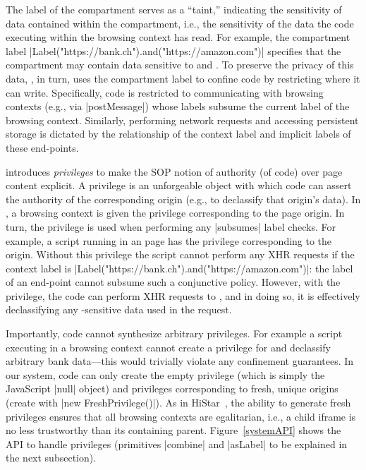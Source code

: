 The label of the compartment serves as a ``taint,'' indicating the
sensitivity of data contained within the compartment, i.e., the
sensitivity of the data the code executing within the browsing context
has read.
%
For example, the compartment label
\js|Label("https://bank.ch").and("https://amazon.com")| specifies that
the compartment may contain data sensitive to  and
.
%
To preserve the privacy of this data, \sys{}, in turn, uses the
compartment label to confine code by restricting where it can write.
%
Specifically, code is restricted to communicating with browsing
contexts (e.g., via \js|postMessage|) whose labels subsume the current
label of the browsing context.
%
Similarly, performing network requests and accessing persistent storage is
dictated by the relationship of the context label and implicit labels of these
end-points.  


\sys{} introduces \emph{privileges} to make the SOP notion of
authority (of code) over page content explicit.
%
A privilege is an unforgeable object with which code can assert the
authority of the corresponding origin (e.g., to declassify that
origin's data).
%
In \sys, a browsing context is given the privilege corresponding to
the page origin.
%
In turn, the privilege is used when performing any \js|subsumes|
label checks.
%
For example, a script running in an  page has the
privilege corresponding to the  origin.
%
Without this privilege the script cannot perform any XHR requests
if the context label is
\js|Label("https://bank.ch").and("https://amazon.com")|:
the label of an end-point cannot subsume such a conjunctive policy.
%
However, with the   privilege, the code can perform
XHR requests to , and in doing so, it is effectively
declassifying any -sensitive data used in the
request.
 
Importantly, code cannot synthesize arbitrary privileges.
%
For example a script executing in a  browsing
context cannot create a privilege for  and declassify
arbitrary bank data---this would trivially violate any confinement
guarantees.
%
In our system, code can only create the empty privilege (which is
simply the JavaScript \js|null| object) and privileges corresponding
to fresh, unique origins (create with \js|new FreshPrivilege()|).
%
As in HiStar~\cite{Zeldovich:2006}, the ability to generate fresh privileges
ensures that all browsing contexts are egalitarian, i.e., a child iframe is no
less trustworthy than its containing parent.  Figure~\ref{systemAPI} shows the
API to handle privileges (primitives \js|combine| and \js|asLabel| to be 
explained in the next subsection). 



